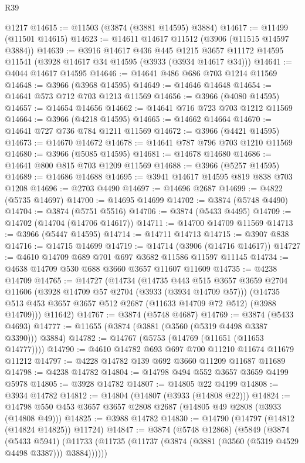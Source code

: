 \begin{lexlean}{R39}
\begin{coremodule}
    @1217
@14615 := @11503 (@3874 (@3881 @14595) @3884)
@14617 := @11499 (@11501 @14615)
@14623 := @14611 @14617 @11512 (@3906 (@11515 @14597 @3884))
@14639 := @3916
    @14617
    @436
    @445
    @1215
    @3657
    @11172
    @14595
    @11541
    (@3928 @14617 @34 @14595 (@3933 (@3934 @14617 @34)))
@14641 := @4044 @14617 @14595
@14646 := @14641 @486 @686 @703 @1214 @11569
@14648 := @3966 (@3968 @14595)
@14649 := @14646 @14648
@14654 := @14641 @573 @712 @703 @1213 @11569
@14656 := @3966 (@4080 @14595)
@14657 := @14654 @14656
@14662 := @14641 @716 @723 @703 @1212 @11569
@14664 := @3966 (@4218 @14595)
@14665 := @14662 @14664
@14670 := @14641 @727 @736 @784 @1211 @11569
@14672 := @3966 (@4421 @14595)
@14673 := @14670 @14672
@14678 := @14641 @787 @796 @703 @1210 @11569
@14680 := @3966 (@5085 @14595)
@14681 := @14678 @14680
@14686 := @14641 @800 @815 @703 @1209 @11569
@14688 := @3966 (@5257 @14595)
@14689 := @14686 @14688
@14695 := @3941 @14617 @14595 @819 @838 @703 @1208
@14696 := @2703 @4490
@14697 := @14696 @2687
@14699 := @4822 (@5735 @14697)
@14700 := @14695 @14699
@14702 := @3874 (@5748 @4490)
@14704 := @3874 (@5751 @5516)
@14706 := @3874 (@5433 @4495)
@14709 := @14702 (@14704 (@14706 @14617))
@14711 := @14700 @14709 @11569
@14713 := @3966 (@5447 @14595)
@14714 := @14711 @14713
@14715 := @3907 @838
@14716 := @14715 @14699
@14719 := @14714 (@3906 (@14716 @14617))
@14727 := @4610 @14709 @689 @701 @697 @3682 @11586 @11597 @11145
@14734 := @4638 @14709 @530 @688 @3660 @3657 @11607 @11609
@14735 := @4238 @14709
@14765 := @14727
    (@14734
      (@14735
        @443
        @515
        @3657
        @3659
        @2704
        @11606
        (@3928 @14709 @57 @2704 (@3933 (@3934 @14709 @57)))
        (@14735 @513 @453 @3657 @3657 @512 @2687 (@11633 @14709 @72 @512) (@3988 @14709)))
      @11642)
@14767 := @3874 (@5748 @4687)
@14769 := @3874 (@5433 @4693)
@14777 := @11655 (@3874 (@3881 (@3560 (@5319 @4498 @3387 @3390))) @3884)
@14782 := @14767 (@5753 (@14769 (@11651 (@11653 @14777))))
@14790 := @4610 @14782 @693 @697 @700 @11210 @11674 @11679 @11212
@14797 := @4228 @14782 @139 @692 @3660 @11209 @11687 @11689
@14798 := @4238 @14782
@14804 := @14798 @494 @552 @3657 @3659 @4199 @5978
@14805 := @3928 @14782
@14807 := @14805 @22 @4199
@14808 := @3934 @14782
@14812 := @14804 (@14807 (@3933 (@14808 @22)))
@14824 := @14798 @550 @453 @3657 @3657 @2808 @2687 (@14805 @49 @2808 (@3933 (@14808 @49)))
@14825 := @3988 @14782
@14830 := @14790 (@14797 (@14812 (@14824 @14825)) @11724)
@14847 := @3874
    (@5748 @12868)
    (@5849
      (@3874
        (@5433 @5941)
        (@11733 (@11735 (@11737 (@3874 (@3881 (@3560 (@5319 @4529 @4498 @3387))) @3884))))))

\end{coremodule}
\end{lexlean}
